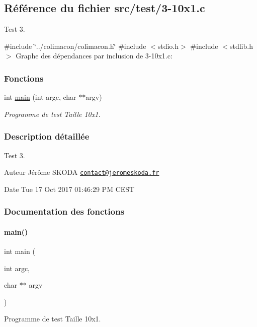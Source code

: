 \hypertarget{3-10x1_8c}{}\subsection{Référence du fichier src/test/3-\/10x1.c}
\label{3-10x1_8c}


Test 3.  


{\ttfamily \#include \char`\"{}../colimacon/colimacon.\+h\char`\"{}}\newline
{\ttfamily \#include $<$stdio.\+h$>$}\newline
{\ttfamily \#include $<$stdlib.\+h$>$}\newline
Graphe des dépendances par inclusion de 3-\/10x1.c\+:
\subsubsection*{Fonctions}
\begin{DoxyCompactItemize}
\item 
int \hyperlink{3-10x1_8c_a3c04138a5bfe5d72780bb7e82a18e627}{main} (int argc, char $\ast$$\ast$argv)
\begin{DoxyCompactList}\small\item\em Programme de test Taille 10x1. \end{DoxyCompactList}\end{DoxyCompactItemize}


\subsubsection{Description détaillée}
Test 3. 

\begin{DoxyAuthor}{Auteur}
Jérôme S\+K\+O\+DA \href{mailto:contact@jeromeskoda.fr}{\tt contact@jeromeskoda.\+fr} 
\end{DoxyAuthor}
\begin{DoxyDate}{Date}
Tue 17 Oct 2017 01\+:46\+:29 PM C\+E\+ST 
\end{DoxyDate}


\subsubsection{Documentation des fonctions}
\mbox{\label{3-10x1_8c_a3c04138a5bfe5d72780bb7e82a18e627}} 
\paragraph{\texorpdfstring{main()}{main()}}
{\footnotesize\ttfamily int main (\begin{DoxyParamCaption}\item[{int}]{argc,  }\item[{char $\ast$$\ast$}]{argv }\end{DoxyParamCaption})}



Programme de test Taille 10x1. 

